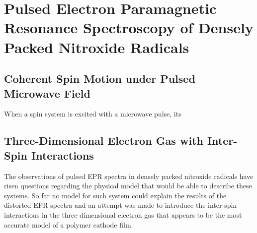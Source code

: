 \chapter{Pulsed Electron Paramagnetic Resonance Spectroscopy of Densely Packed Nitroxide Radicals}

\section{Coherent Spin Motion under Pulsed Microwave Field}
When a spin system is excited with a microwave pulse, its 


\section{Three-Dimensional Electron Gas with Inter-Spin Interactions}
The observations of pulsed EPR spectra in densely packed nitroxide radicals have risen questions regarding the physical model that would be able to describe these systems. So far no model for such system could explain the results of the distorted EPR spectra and an attempt was made to introduce the inter-spin interactions in the three-dimensional electron gas that appears to be the most accurate model of a polymer cathode film.



